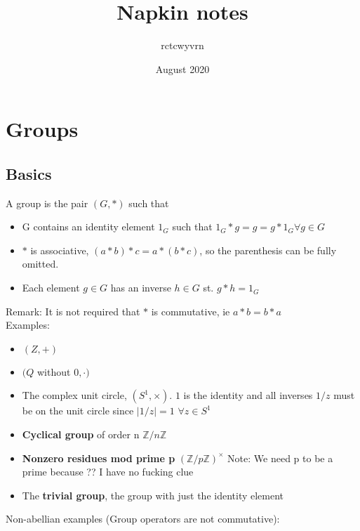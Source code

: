 \documentclass{article}
\title{Napkin notes}
\author{rctcwyvrn }
\date{August 2020}
\begin{document}
\maketitle


\section{Groups}
\subsection{Basics}
A group is the pair $(G,*)$ such that
\begin{itemize}
    \item G contains an identity element $1_G$ such that $1_G * g = g = g * 1_G \forall g \in G$
    \item $*$ is associative, $(a*b)*c = a*(b*c)$, so the parenthesis can be fully omitted.
    \item Each element $g\in G$ has an inverse $h\in G$ st. $g*h = 1_G$
\end{itemize}
Remark: It is not required that $*$ is commutative, ie $a*b = b*a$ \\
\newline
Examples: 
\begin{itemize}
    \item $(Z,+)$
    \item $(Q$ without $0, \cdot)$
    \item The complex unit circle, $(S^1,\times)$. $1$ is the identity and all inverses $1/z$ must be on the unit circle since $|1/z| = 1$ $\forall z \in S^1$
    \item \textbf{Cyclical group} of order n $\mathbb{Z}/n\mathbb{Z}$
    \item \textbf{Nonzero residues mod prime p} $(\mathbb{Z}/p\mathbb{Z})^\times$ \newline \textbullet  Note: We need p to be a prime because ?? I have no fucking clue
    \item The \textbf{trivial group}, the group with just the identity element
\end{itemize}
Non-abellian examples (Group operators are not commutative):
\end{document}
